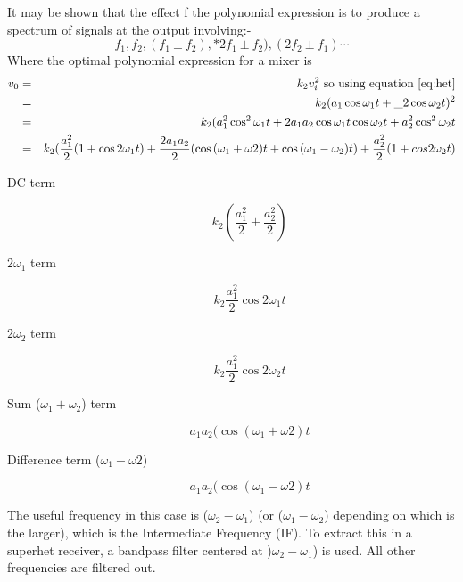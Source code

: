 \documentclass[11pt]{article} %
\begin{document}
	It may be shown that the effect f the polynomial expression is to produce a spectrum of signals at the output involving:-
	\begin{equation}
		f_1, f_2, (f_1\pm f_2), *2f_1\pm f_2), (2f_2 \pm f_1)\cdots
	\end{equation}
	Where the optimal polynomial expression for a mixer is
	\begin{eqnarray}
		v_0 &=& k_2 v_i^2 \mbox{ so using equation \ref{eq:het}} \nonumber \\
		&=& k_2(a_1 \cos{\omega_1t} + \_2 \cos{\omega_2t})^2 \nonumber \\
		&=& k_2(a_1^2 \cos^2{\omega_1t} + 2a_1a_2\cos{\omega_1t}\cos{\omega_2t}+ a^2_2\cos^2{\omega_2t}\nonumber \\
		&=& k_2(\frac{a_1^2}{2}(1+\cos{2\omega_1t})+
		\frac{2a_1 a_2}{2}(\cos{(\omega_1+\omega2 )t}+\cos{(\omega_1-\omega_2)t})+\frac{a_2^2}{2}(1+cos{2\omega_2t}) 
	\end{eqnarray}
	\begin{description}
		\item[DC term]
			\begin{equation}
				k_2\left(\frac{a_1^2}{2} + \frac{a_2^2}{2}\right)
			\end{equation}

		\item[$2\omega_1$ term]
			\begin{equation}
				k_2\frac{a_1^2}{2}\cos{2\omega_1t}
			\end{equation}

		\item[$2\omega_2$ term]
			\begin{equation}
				k_2\frac{a_1^2}{2}\cos{2\omega_2t}
			\end{equation}

		\item[Sum ($\omega_1+\omega_2$) term]
			\begin{equation}
				a_1 a_2(\cos{(\omega_1+\omega2 )t}
			\end{equation}

		\item[Difference term ($\omega_1 - \omega2$)]
			\begin{equation}
				a_1 a_2(\cos{(\omega_1-\omega2 )t}
			\end{equation}
	\end{description}

	The useful frequency in this case is ($\omega_2-\omega_1$) (or ($\omega_1-\omega_2$) depending on which is the larger), which is the Intermediate Frequency (IF). 
	To extract this in a superhet receiver, a bandpass filter centered at )$\omega_2 - \omega_1$) is used. All other frequencies are filtered out.
\end{document}
